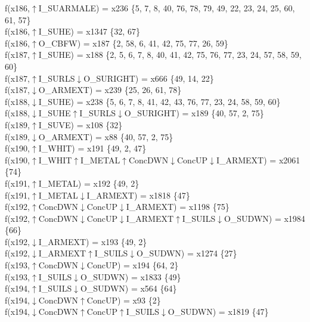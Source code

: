 f(x186,$\uparrow$I\_SUARMALE) = x236 \{5, 7, 8, 40, 76, 78, 79, 49, 22, 23, 24, 25, 60, 61, 57\} \\  
f(x186,$\uparrow$I\_SUHE) = x1347 \{32, 67\} \\  
f(x186,$\uparrow$O\_CBFW) = x187 \{2, 58, 6, 41, 42, 75, 77, 26, 59\} \\  
f(x187,$\uparrow$I\_SUHE) = x188 \{2, 5, 6, 7, 8, 40, 41, 42, 75, 76, 77, 23, 24, 57, 58, 59, 60\} \\  
f(x187,$\uparrow$I\_SURLS$\downarrow$O\_SURIGHT) = x666 \{49, 14, 22\} \\  
f(x187,$\downarrow$O\_ARMEXT) = x239 \{25, 26, 61, 78\} \\  
f(x188,$\downarrow$I\_SUHE) = x238 \{5, 6, 7, 8, 41, 42, 43, 76, 77, 23, 24, 58, 59, 60\} \\  
f(x188,$\downarrow$I\_SUHE$\uparrow$I\_SURLS$\downarrow$O\_SURIGHT) = x189 \{40, 57, 2, 75\} \\  
f(x189,$\uparrow$I\_SUVE) = x108 \{32\} \\  
f(x189,$\downarrow$O\_ARMEXT) = x88 \{40, 57, 2, 75\} \\  
f(x190,$\uparrow$I\_WHIT) = x191 \{49, 2, 47\} \\  
f(x190,$\uparrow$I\_WHIT$\uparrow$I\_METAL$\uparrow$ConcDWN$\downarrow$ConcUP$\downarrow$I\_ARMEXT) = x2061 \{74\} \\  
f(x191,$\uparrow$I\_METAL) = x192 \{49, 2\} \\  
f(x191,$\uparrow$I\_METAL$\downarrow$I\_ARMEXT) = x1818 \{47\} \\  
f(x192,$\uparrow$ConcDWN$\downarrow$ConcUP$\downarrow$I\_ARMEXT) = x1198 \{75\} \\  
f(x192,$\uparrow$ConcDWN$\downarrow$ConcUP$\downarrow$I\_ARMEXT$\uparrow$I\_SUILS$\downarrow$O\_SUDWN) = x1984 \{66\} \\  
f(x192,$\downarrow$I\_ARMEXT) = x193 \{49, 2\} \\  
f(x192,$\downarrow$I\_ARMEXT$\uparrow$I\_SUILS$\downarrow$O\_SUDWN) = x1274 \{27\} \\  
f(x193,$\uparrow$ConcDWN$\downarrow$ConcUP) = x194 \{64, 2\} \\  
f(x193,$\uparrow$I\_SUILS$\downarrow$O\_SUDWN) = x1833 \{49\} \\  
f(x194,$\uparrow$I\_SUILS$\downarrow$O\_SUDWN) = x564 \{64\} \\  
f(x194,$\downarrow$ConcDWN$\uparrow$ConcUP) = x93 \{2\} \\  
f(x194,$\downarrow$ConcDWN$\uparrow$ConcUP$\uparrow$I\_SUILS$\downarrow$O\_SUDWN) = x1819 \{47\} \\  
